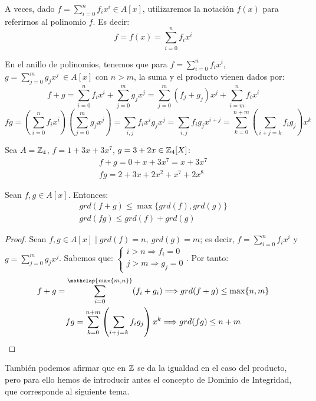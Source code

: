 \begin{notacion}
    A veces, dado $f=\sum\limits_{i=0}^n f_i x^i \in A[x]$, utilizaremos la notación $f(x)$ para referirnos al polinomio $f$. Es decir:
    $$f = f(x) = \sum_{i=0}^n f_i x^i$$
\end{notacion}

En el anillo de polinomios, tenemos que para $f = \sum\limits_{i=0}^n f_i x^i$, $g = \sum\limits_{j=0}^m g_j x^j ~\in A[x]$ con $n > m$, la suma y el producto vienen dados por:
\begin{equation*}
    f+g = \sum\limits_{i=0}^n f_i x^i + \sum\limits_{j=0}^m g_j x^j = \sum_{j=0}^m (f_j + g_j)x^j + \sum_{i=m}^n f_i x^i
\end{equation*}
\begin{equation*}
    fg = \left(\sum\limits_{i=0}^n f_i x^i \right) \left( \sum\limits_{j=0}^m g_j x^j\right) = \sum_{i,j} f_i x^i g_j x^j = \sum_{i,j} f_i g_j x^{i+j} = \sum_{k=0}^{n+m} \left( \sum_{i+j=k} f_i g_j \right) x^k
\end{equation*}

\begin{ejemplo}
    Sea $A = \mathbb Z_4$, $f = 1 + 3x + 3x^7$, $g=3+2x \in \mathbb Z_4[X]$:
    \begin{gather*}
        f+g = 0 + x + 3x^7 = x + 3x^7\\
        fg = 2 + 3x + 2x^2 + x^7 + 2x^8
    \end{gather*}
\end{ejemplo}

\begin{prop}
    Sean $f,g \in A[x]$. Entonces:
    \begin{gather*}
        grd(f+g) \leq \max\{grd(f), grd(g)\} \\
        grd(fg) \leq grd(f) + grd(g)
    \end{gather*}
\end{prop}
\begin{proof}
    Sean $f,g \in A[x] \mid grd(f) = n,~grd(g) = m$; es decir, $f = \sum\limits_{i=0}^n f_ix^i$ y $g=\sum\limits_{j=0}^m g_j x^j$. Sabemos que: 
        $\left\{\begin{array}{c}
            i>n \Longrightarrow f_i=0\\
            j>m \Longrightarrow g_j=0
        \end{array}\right.$. Por tanto:
    \begin{multline*}
        f+g = \sum_{i=0}^{\mathclap{\max\{m,n\}}} (f_i+g_i) \Longrightarrow grd(f+g) \leq \max\{n,m\}\\
        fg = \sum_{k=0}^{n+m} \left( \sum_{i+j=k} f_ig_j \right)x^k \Longrightarrow grd(fg) \leq n+m
    \end{multline*}
\end{proof}
También podemos afirmar que en $\mathbb Z$ se da la igualdad en el caso del producto, pero para ello hemos de introducir antes el concepto de Dominio de Integridad, que corresponde al siguiente tema.

